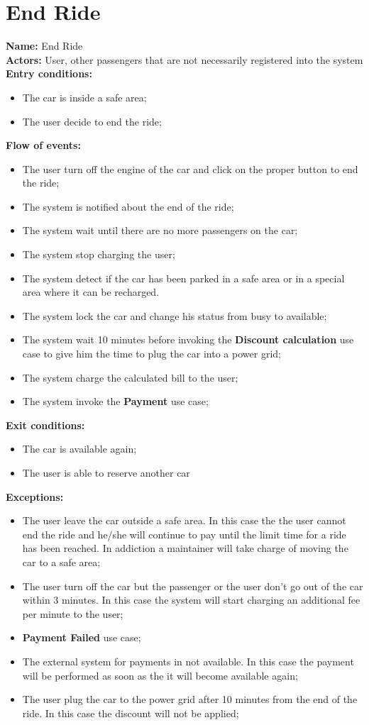 \section*{End Ride}
\textbf{Name:} End Ride\\
\textbf{Actors:} User, other passengers that are not necessarily registered into the system\\
\textbf{Entry conditions:}
\begin{itemize}
\item The car is inside a safe area;
\item The user decide to end the ride;
\end{itemize}
\textbf{Flow of events:}
\begin{itemize}
\item The user turn off the engine of the car and click on the proper button to end the ride;
\item The system is notified about the end of the ride;
\item The system wait until there are no more passengers on the car;
\item The system stop charging the user;
\item The system detect if the car has been parked in a safe area or in a special area where it can be recharged.
\item The system lock the car and change his status from busy to available;
\item The system wait 10 minutes before invoking the \textbf{Discount calculation} use case to give him the time to plug the car into a power grid;
\item The system charge the calculated bill to the user;
\item The system invoke the \textbf{Payment} use case;
\end{itemize}
\textbf{Exit conditions:}
\begin{itemize}
\item The car is available again;
\item The user is able to reserve another car
\end{itemize}
\textbf{Exceptions:}
\begin{itemize}
\item The user leave the car outside a safe area. In this case the the user cannot end the ride and he/she will continue to pay until the limit time for a ride has been reached. In addiction a maintainer will take charge of moving the car to a safe area;
\item The user turn off the car but the passenger or the user don't go out of the car within 3 minutes. In this case the system will start charging an additional fee per minute to the user;
\item\textbf{Payment Failed} use case;
\item The external system for payments in not available. In this case the payment will be performed as soon as the it will become available again;
\item The user plug the car to the power grid after 10 minutes from the end of the ride. In this case the discount will not be applied;
\end{itemize}

